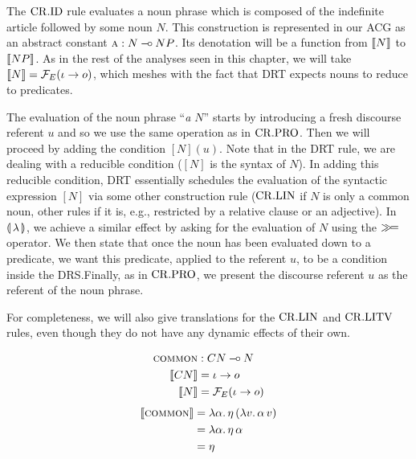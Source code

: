 \vspace{6mm}

The $\mathrm{CR.ID}$ rule evaluates a noun phrase which is composed of the
indefinite article followed by some noun $N$. This construction is
represented in our ACG as an abstract constant $\textsc{a} : N \mathbin{{-}\mkern-3.5mu{\circ}} NP$. Its
denotation will be a function from $\llbracket N \rrbracket$ to $\llbracket NP \rrbracket$. As in the rest
of the analyses seen in this chapter, we will take
$\llbracket N \rrbracket = \mathcal{F}_E(\iota \to o)$, which meshes with the fact that DRT expects
nouns to reduce to predicates.

The evaluation of the noun phrase ``\emph{a $N$}'' starts by introducing a
fresh discourse referent $u$ and so we use the same operation as in
$\mathrm{CR.PRO}$. Then we will proceed by adding the condition $[N](u)$. Note that
in the DRT rule, we are dealing with a reducible condition ($[N]$ is the
syntax of $N$). In adding this reducible condition, DRT essentially
schedules the evaluation of the syntactic expression $[N]$ via some other
construction rule ($\mathrm{CR.LIN}$ if $N$ is only a common noun, other rules if it
is, e.g., restricted by a relative clause or an adjective). In
$\llparenthesis \, \lambda \, \rrparenthesis$, we achieve a similar effect by asking for the
evaluation of $N$ using the $\mathbin{\gg\!=}$ operator. We then state that once the
noun has been evaluated down to a predicate, we want this predicate,
applied to the referent $u$, to be a condition inside the DRS.\@ Finally,
as in $\mathrm{CR.PRO}$, we present the discourse referent $u$ as the referent of
the noun phrase.

For completeness, we will also give translations for the $\mathrm{CR.LIN}$ and
$\mathrm{CR.LITV}$ rules, even though they do not have any dynamic effects of their
own.

\vspace{6mm}

\begin{minipage}{0.5\textwidth}
\crlinbox
\end{minipage}
\begin{minipage}{0.5\textwidth}
\begin{align*}
\textsc{common} &: CN \mathbin{{-}\mkern-3.5mu{\circ}} N \\
\llbracket CN \rrbracket &= \iota \to o \\
\llbracket N \rrbracket &= \mathcal{F}_E(\iota \to o)
\end{align*}
\begin{align*}
\llbracket \textsc{common} \rrbracket &= \lambda \alpha.\, \eta\,(\lambda v.\, \alpha\,v) \\
                   &= \lambda \alpha.\, \eta\,\alpha \\
                   &= \eta
\end{align*}
\end{minipage}


